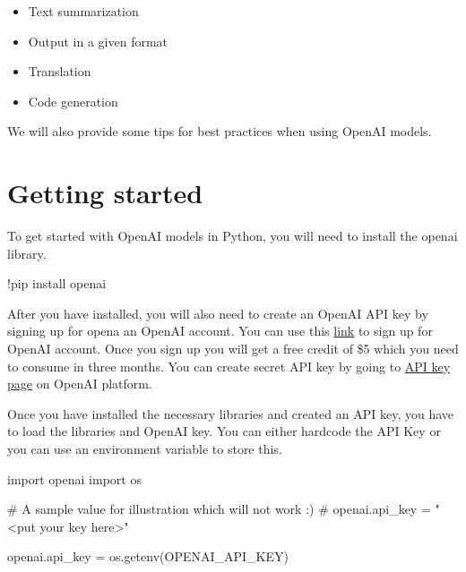 \documentclass[
  letterpaper,
  DIV=11,
  numbers=noendperiod]{scrreprt}
\newenvironment{Shaded}{\begin{snugshade}}{\end{snugshade}}
\newcommand{\CommentTok}[1]{\textcolor[rgb]{0.37,0.37,0.37}{#1}}
\newcommand{\ImportTok}[1]{\textcolor[rgb]{0.00,0.46,0.62}{#1}}
\newcommand{\NormalTok}[1]{\textcolor[rgb]{0.00,0.23,0.31}{#1}}
\newcommand{\OperatorTok}[1]{\textcolor[rgb]{0.37,0.37,0.37}{#1}}
\newcommand{\StringTok}[1]{\textcolor[rgb]{0.13,0.47,0.30}{#1}}
\begin{document}
\begin{itemize}
\item
  Text summarization
\item
  Output in a given format
\item
  Translation
\item
  Code generation
\end{itemize}

We will also provide some tips for best practices when using OpenAI
models.

\hypertarget{getting-started}{%
\section{Getting started}\label{getting-started}}

To get started with OpenAI models in Python, you will need to install
the openai library.

\begin{Shaded}
\begin{Highlighting}[]
\OperatorTok{!}\NormalTok{pip install openai}
\end{Highlighting}
\end{Shaded}

After you have installed, you will also need to create an OpenAI API key
by signing up for opena an OpenAI account. You can use this
\href{https://platform.openai.com/}{link} to sign up for OpenAI account.
Once you sign up you will get a free credit of \$5 which you need to
consume in three months. You can create secret API key by going to
\href{https://platform.openai.com/account/api-keys}{API key page} on
OpenAI platform.

Once you have installed the necessary libraries and created an API key,
you have to load the libraries and OpenAI key. You can either hardcode
the API Key or you can use an environment variable to store this.

\begin{Shaded}
\begin{Highlighting}[]
\ImportTok{import}\NormalTok{ openai}
\ImportTok{import}\NormalTok{ os}

\CommentTok{\# A sample value for illustration which will not work :)}
\CommentTok{\# openai.api\_key  = "\textless{}put your key here\textgreater{}" }

\NormalTok{openai.api\_key  }\OperatorTok{=}\NormalTok{ os.getenv(}\StringTok{\textquotesingle{}OPENAI\_API\_KEY\textquotesingle{}}\NormalTok{)}
\end{Highlighting}
\end{Shaded}
\end{document}
